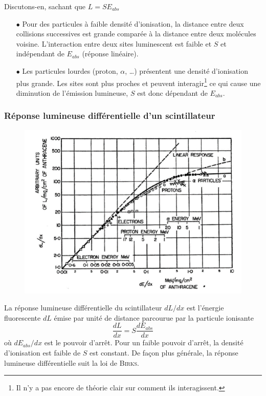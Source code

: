 Discutons-en, sachant que $L = SE_{abs}$
\begin{itemize}
\item[$\bullet$] Pour des particules à faible densité d'ionisation, la distance entre deux collisions
successives est grande comparée à la distance entre deux molécules voisine. L'interaction entre deux
sites luminescent est faible et $S$ et indépendant de $E_{abs}$ (réponse linéaire).
\item[$\bullet$] Les particules lourdes (proton, $\alpha$, \dots) présentent une densité d'ionisation
plus grande. Les sites sont plus proches et peuvent interagir\footnote{Il n'y a pas encore de 
théorie clair sur comment ils interagissent.} ce qui cause une diminution de l'émission lumineuse, 
$S$ est donc dépendant de $E_{abs}$.
\end{itemize}


\subsubsection{Réponse lumineuse différentielle d'un scintillateur}%
	\begin{figure}
	\vspace{-15mm}
	\includegraphics[scale=0.4]{ch10/image3}
	\end{figure}
La réponse lumineuse différentielle du scintillateur $dL/dx$ est l'énergie fluorescente $dL$ émise
par unité de distance parcourue par la particule ionisante
\begin{equation}
\frac{dL}{dx}=S\frac{dE_{abs}}{dx}
\end{equation}
où $dE_{abs}/dx$ est le pouvoir d'arrêt. Pour un faible pouvoir d'arrêt, la densité d'ionisation 
est faible de $S$ est constant. De façon plus générale, la réponse lumineuse différentielle suit
la loi de \textsc{Birks}. \\

